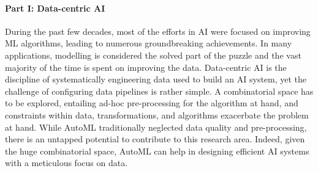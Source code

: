 \paragraph{Part I: Data-centric AI}

During the past few decades, most of the efforts in AI were focused on improving ML algorithms, leading to numerous groundbreaking achievements.
In many applications, modelling is considered the solved part of the puzzle and the vast majority of the time is spent on improving the data.
Data-centric AI is the discipline of systematically engineering data used to build an AI system, yet the challenge of configuring data pipelines is rather simple.
A combinatorial space has to be explored, entailing ad-hoc pre-processing for the algorithm at hand, and constraints within data, transformations, and algorithms exacerbate the problem at hand.
While AutoML traditionally neglected data quality and pre-processing, there is an untapped potential to contribute to this research area.
Indeed, given the huge combinatorial space, AutoML can help in designing efficient AI systems with a meticulous focus on data.



